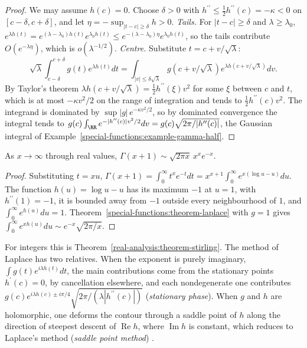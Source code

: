 \begin{proof}
We may assume $h(c) = 0$. Choose $\delta > 0$ with $h^{\prime\prime} \leq \frac12h^{\prime\prime}(c) = -\kappa < 0$ on $[c - \delta, c + \delta]$, and let $\eta = -\sup_{|t-c| \geq \delta}h > 0$.
\emph{Tails.} For $|t - c| \geq \delta$ and $\lambda \geq \lambda_0$, $e^{\lambda h(t)} = e^{(\lambda - \lambda_0)h(t)}e^{\lambda_0h(t)} \leq e^{-(\lambda - \lambda_0)\eta}e^{\lambda_0h(t)}$, so the tails contribute
$O(e^{-\lambda\eta})$, which is $o(\lambda^{-1/2})$.
\emph{Centre.} Substitute $t = c + v/\sqrt{\lambda}$:
\[
\sqrt{\lambda}\int_{c-\delta}^{c+\delta}g(t)e^{\lambda h(t)}dt = \int_{|v| \leq \delta\sqrt{\lambda}}g(c + v/\sqrt{\lambda})e^{\lambda h(c + v/\sqrt{\lambda})}dv.
\]
By Taylor's theorem $\lambda h(c + v/\sqrt{\lambda}) = \frac12h^{\prime\prime}(\xi)v^2$ for some $\xi$ between $c$ and $t$, which is at most $-\kappa v^2/2$ on the range of integration and tends to $\frac12h^{\prime\prime}(c)v^2$. The integrand
is dominated by $\sup|g|\,e^{-\kappa v^2/2}$, so by dominated convergence the integral tends to $g(c)\int_\RR e^{-|h^{\prime\prime}(c)|v^2/2}dv = g(c)\sqrt{2\pi/|h^{\prime\prime}(c)|}$, the Gaussian integral of
Example~\ref{special-functions:example-gamma-half}.
\end{proof}

\begin{corollary}\label{special-functions:corollary-stirling-gamma}
As $x \to \infty$ through real values, $\Gamma(x + 1) \sim \sqrt{2\pi x}\,x^xe^{-x}$.
\end{corollary}

\begin{proof}
Substituting $t = xu$, $\Gamma(x + 1) = \int_0^\infty t^xe^{-t}dt = x^{x+1}\int_0^\infty e^{x(\log u - u)}du$. The function $h(u) = \log u - u$ has its maximum $-1$ at $u = 1$, with $h^{\prime\prime}(1) = -1$, it is bounded away
from $-1$ outside every neighbourhood of $1$, and $\int_0^\infty e^{h(u)}du = 1$. Theorem~\ref{special-functions:theorem-laplace} with $g = 1$ gives $\int_0^\infty e^{xh(u)}du \sim e^{-x}\sqrt{2\pi/x}$.
\end{proof}

For integers this is Theorem~\ref{real-analysis:theorem-stirling}. The method of Laplace has two relatives. When the exponent is purely imaginary, $\int g(t)e^{i\lambda h(t)}dt$, the main contributions come from the
stationary points $h^{\prime}(c) = 0$, by cancellation elsewhere, and each nondegenerate one contributes $g(c)e^{i\lambda h(c) \pm i\pi/4}\sqrt{2\pi/(\lambda|h^{\prime\prime}(c)|)}$ (\emph{stationary phase}). When $g$ and $h$
are holomorphic, one deforms the contour through a saddle point of $h$ along the direction of steepest descent of $\operatorname{Re}h$, where $\operatorname{Im}h$ is constant, which reduces to Laplace's method
(\emph{saddle point method}) \cite{olver-asymptotics}.

